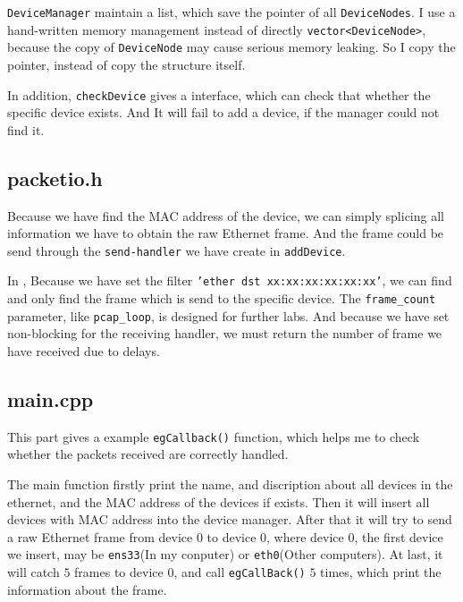\documentclass[11pt]{article}
\begin{document}
	\par \texttt{DeviceManager} maintain a list, which save the pointer of all \texttt{DeviceNodes}. I use a hand-written memory management instead of directly \texttt{vector<DeviceNode>}, because the copy of \texttt{DeviceNode} may cause serious memory leaking. So I copy the pointer, instead of copy the structure itself.
	
	\par In addition, \texttt{checkDevice} gives a interface, which can check that whether the specific device exists. And It will fail to add a device, if the manager could not find it.
	
	\subsection*{packetio.h}
	
	\par Because we have find the MAC address of the device, we can simply splicing all information we have to obtain the raw Ethernet frame. And the frame could be send through the \texttt{send-handler} we have create in \texttt{addDevice}.
	
	\par In , Because we have set the filter \texttt{'ether dst xx:xx:xx:xx:xx:xx'}, we can find and only find the frame which is send to the specific device. The \texttt{frame\_count} parameter, like \texttt{pcap\_loop}, is designed for further labs. And because we have set non-blocking for the receiving handler, we must return the number of frame we have received due to delays.
	
	\subsection*{main.cpp}
	
	\par This part gives a example \texttt{egCallback()} function, which helps me to check whether the packets received are correctly handled.
	
	\par The main function firstly print the name, and discription about all devices in the ethernet, and the MAC address of the devices if exists. Then it will insert all devices with MAC address into the device manager. After that it will try to send a raw Ethernet frame from device $0$ to device $0$, where device $0$, the first device we insert, may be \texttt{ens33}(In my conputer) or \texttt{eth0}(Other computers). At last, it will catch $5$ frames to device $0$, and call \texttt{egCallBack()} $5$ times, which print the information about the frame.
	
\end{document}
